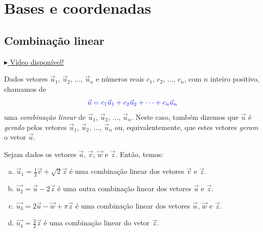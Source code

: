 
\chapter{Bases e coordenadas}\label{cap_base}
\badgeRevisar

\section{Combinação linear}\label{cap_base_sec_comblin}
\badgeRevisar

\begin{flushright}
  \href{https://archive.org/details/combinacao-linear}{$\blacktriangleright$ Vídeo disponível!}
\end{flushright}

Dados vetores $\vec{u}_1$, $\vec{u}_2$, $\dotsc$, $\vec{u}_n$ e números reais $c_1$, $c_2$, $\dotsc$, $c_n$, com $n$ inteiro positivo, chamamos de
\begin{equation}
  {\color{blue}\vec{u} = c_1\vec{u}_1 + c_2\vec{u}_2 + \cdots + c_n\vec{u}_n}
\end{equation}
uma \emph{combinação linear} de $\vec{u}_1$, $\vec{u}_2$, $\dotsc$, $\vec{u}_n$. Neste caso, também dizemos que $\vec{u}$ é \emph{gerado} pelos vetores $\vec{u}_1$, $\vec{u}_2$, $\dotsc$, $\vec{u}_n$ ou, equivalentemente, que estes vetores \emph{geram} o vetor $\vec{u}$.

\begin{ex}\label{ex:comblinear}
  Sejam dados os vetores $\vec{u}$, $\vec{v}$, $\vec{w}$ e $\vec{z}$. Então, temos:
  \begin{enumerate}[a)]
  \item $\vec{u}_1 = \frac{1}{2}\vec{v} + \sqrt{2}\vec{z}$ é uma combinação linear dos vetores $\vec{v}$ e $\vec{z}$.
  \item $\vec{u_2} = \vec{u} - 2\vec{z}$ é uma outra combinação linear dos vetores $\vec{u}$ e $\vec{z}$.
  \item $\vec{u_3} = 2\vec{u} - \vec{w} + \pi\vec{z}$ é uma combinação linear dos vetores $\vec{u}$, $\vec{w}$ e $\vec{z}$.
  \item $\vec{u_4} = \frac{3}{2}\vec{z}$ é uma combinação linear do vetor $\vec{z}$.
  \end{enumerate}
\end{ex}

